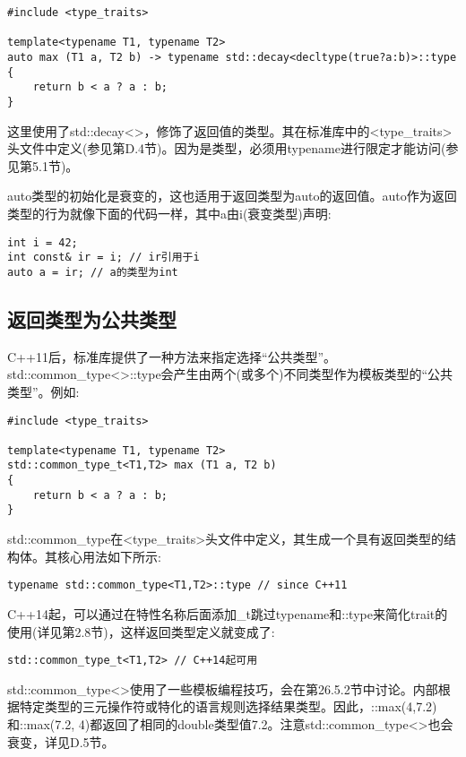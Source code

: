 \begin{lstlisting}[style=styleCXX]
#include <type_traits>

template<typename T1, typename T2>
auto max (T1 a, T2 b) -> typename std::decay<decltype(true?a:b)>::type
{
	return b < a ? a : b;
}
\end{lstlisting}

这里使用了std::decay<>，修饰了返回值的类型。其在标准库中的<type\_traits>头文件中定义(参见第D.4节)。因为是类型，必须用typename进行限定才能访问(参见第5.1节)。

auto类型的初始化是衰变的，这也适用于返回类型为auto的返回值。auto作为返回类型的行为就像下面的代码一样，其中a由i(衰变类型)声明:

\begin{lstlisting}[style=styleCXX]
int i = 42;
int const& ir = i; // ir引用于i
auto a = ir; // a的类型为int
\end{lstlisting}

\subsection{返回类型为公共类型}

C++11后，标准库提供了一种方法来指定选择“公共类型”。std::common\_type<>::type会产生由两个(或多个)不同类型作为模板类型的“公共类型”。例如:

\begin{lstlisting}[style=styleCXX]
#include <type_traits>

template<typename T1, typename T2>
std::common_type_t<T1,T2> max (T1 a, T2 b)
{
	return b < a ? a : b;
}
\end{lstlisting}

std::common\_type在<type\_traits>头文件中定义，其生成一个具有返回类型的结构体。其核心用法如下所示:

\begin{lstlisting}[style=styleCXX]
typename std::common_type<T1,T2>::type // since C++11
\end{lstlisting}

C++14起，可以通过在特性名称后面添加\_t跳过typename和::type来简化trait的使用(详见第2.8节)，这样返回类型定义就变成了:

\begin{lstlisting}[style=styleCXX]
std::common_type_t<T1,T2> // C++14起可用
\end{lstlisting}

std::common\_type<>使用了一些模板编程技巧，会在第26.5.2节中讨论。内部根据特定类型的三元操作符或特化的语言规则选择结果类型。因此，::max(4,7.2)和::max(7.2, 4)都返回了相同的double类型值7.2。注意std::common\_type<>也会衰变，详见D.5节。




